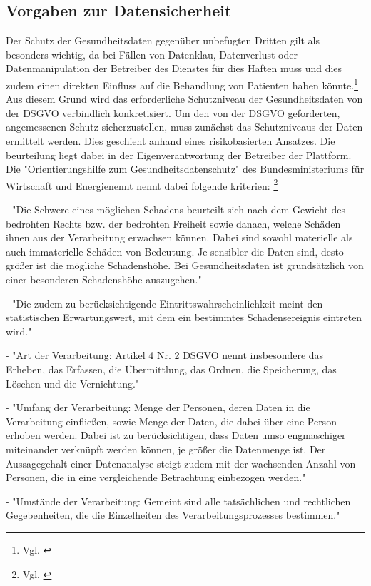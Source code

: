 \subsection{Vorgaben zur Datensicherheit}\label{subsection:vzd}
Der Schutz der Gesundheitsdaten gegenüber unbefugten Dritten gilt als besonders wichtig, da bei Fällen von Datenklau, Datenverlust oder Datenmanipulation der Betreiber des Dienstes für dies Haften muss und dies zudem einen direkten Einfluss auf die Behandlung von Patienten haben könnte.\footnote{Vgl. \cite[S. 3]{OrientierungshilfezumGesundheitsdatenschutz2018}} Aus diesem Grund wird das erforderliche Schutzniveau der Gesundheitsdaten von der DSGVO verbindlich konkretisiert.
Um den von der DSGVO geforderten, angemessenen Schutz sicherzustellen, muss zunächst das Schutzniveaus der Daten ermittelt werden.
Dies geschieht anhand eines risikobasierten Ansatzes. Die beurteilung liegt dabei in der Eigenverantwortung der Betreiber der Plattform. Die "Orientierungshilfe zum Gesundheitsdatenschutz" des Bundesministeriums für Wirtschaft und Energienennt nennt dabei folgende kriterien:
\footnote{Vgl. \cite[S. 41 ff.]{OrientierungshilfezumGesundheitsdatenschutz2018}}

- "Die Schwere eines möglichen Schadens beurteilt sich nach dem Gewicht des bedrohten Rechts bzw. der bedrohten Freiheit sowie danach, welche Schäden ihnen aus der Verarbeitung erwachsen können. Dabei sind sowohl materielle als auch immaterielle Schäden von Bedeutung. Je sensibler die Daten sind, desto größer ist die mögliche Schadenshöhe. Bei Gesundheitsdaten ist grundsätzlich von einer besonderen Schadenshöhe auszugehen."

- "Die zudem zu berücksichtigende Eintrittswahrscheinlichkeit meint den statistischen Erwartungswert, mit dem ein bestimmtes Schadensereignis eintreten wird."

- "Art der Verarbeitung: Artikel 4 Nr. 2 DSGVO nennt insbesondere das Erheben, das Erfassen, die Übermittlung, das Ordnen, die Speicherung, das Löschen und die Vernichtung."

- "Umfang der Verarbeitung: Menge der Personen, deren Daten in die Verarbeitung einfließen, sowie Menge der Daten, die dabei über eine Person erhoben werden. Dabei ist zu berücksichtigen, dass Daten umso engmaschiger miteinander verknüpft werden können, je größer die Datenmenge ist. Der Aussagegehalt einer Datenanalyse steigt zudem mit der wachsenden Anzahl von Personen, die in eine vergleichende Betrachtung einbezogen werden."

- "Umstände der Verarbeitung: Gemeint sind alle tatsächlichen und rechtlichen Gegebenheiten, die die Einzelheiten des Verarbeitungsprozesses bestimmen."

